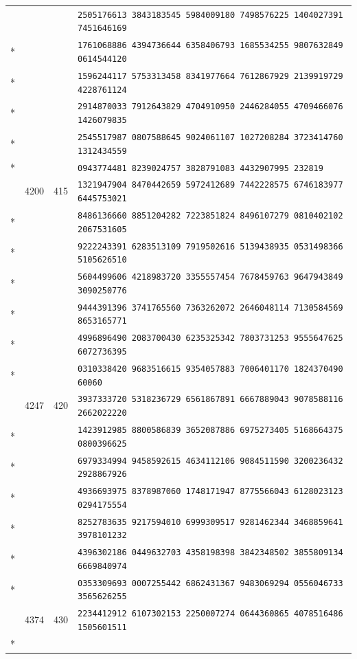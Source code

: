\documentclass[10pt]{article}
\begin{document}
\begin{longtable}{@{}r@{\quad}r@{\quad}r@{\quad}l@{}}
 & &  & \texttt{2505176613 3843183545 5984009180 7498576225 1404027391 7451646169}\\*
 & &  & \texttt{1761068886 4394736644 6358406793 1685534255 9807632849 0614544120}\\*
 & &  & \texttt{1596244117 5753313458 8341977664 7612867929 2139919729 4228761124}\\*
 & &  & \texttt{2914870033 7912643829 4704910950 2446284055 4709466076 1426079835}\\*
 & &  & \texttt{2545517987 0807588645 9024061107 1027208284 3723414760 1312434559}\\*
 & &  & \texttt{0943774481 8239024757 3828791083 4432907995 232819}\\
\addlinespace[2pt]
83 & 4200 & 415 & \texttt{1321947904 8470442659 5972412689 7442228575 6746183977 6445753021}\\*
 & &  & \texttt{8486136660 8851204282 7223851824 8496107279 0810402102 2067531605}\\*
 & &  & \texttt{9222243391 6283513109 7919502616 5139438935 0531498366 5105626510}\\*
 & &  & \texttt{5604499606 4218983720 3355557454 7678459763 9647943849 3090250776}\\*
 & &  & \texttt{9444391396 3741765560 7363262072 2646048114 7130584569 8653165771}\\*
 & &  & \texttt{4996896490 2083700430 6235325342 7803731253 9555647625 6072736395}\\*
 & &  & \texttt{0310338420 9683516615 9354057883 7006401170 1824370490 60060}\\
\addlinespace[2pt]
84 & 4247 & 420 & \texttt{3937333720 5318236729 6561867891 6667889043 9078588116 2662022220}\\*
 & &  & \texttt{1423912985 8800586839 3652087886 6975273405 5168664375 0800396625}\\*
 & &  & \texttt{6979334994 9458592615 4634112106 9084511590 3200236432 2928867926}\\*
 & &  & \texttt{4936693975 8378987060 1748171947 8775566043 6128023123 0294175554}\\*
 & &  & \texttt{8252783635 9217594010 6999309517 9281462344 3468859641 3978101232}\\*
 & &  & \texttt{4396302186 0449632703 4358198398 3842348502 3855809134 6669840974}\\*
 & &  & \texttt{0353309693 0007255442 6862431367 9483069294 0556046733 3565626255}\\
\addlinespace[2pt]
85 & 4374 & 430 & \texttt{2234412912 6107302153 2250007274 0644360865 4078516486 1505601511}\\*

\end{longtable}
\end{document}
